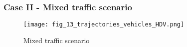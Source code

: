\begin{frame}
  \frametitle{Case II - Mixed traffic scenario}
  \begin{figure}
    \centering
    \texttt{[image: fig\_13\_trajectories\_vehicles\_HDV.png]}
    \caption{Mixed traffic scenario}
  \end{figure}
\end{frame}